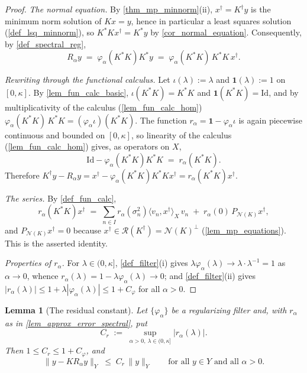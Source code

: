 \documentclass[a4paper]{report}
\theoremstyle{plain}
\newtheorem{lemma}[theorem]{Lemma}
\theoremstyle{definition}
\theoremstyle{remark}
\newcommand{\Ran}{\mathcal{R}}
\newcommand{\Ker}{\mathcal{N}}
\newcommand{\Id}{\mathrm{Id}}
\newcommand{\dg}{^{\dagger}}
\begin{document}
\begin{proof}
  \emph{The normal equation.}  By \cref{thm_mp_minnorm}(ii), $x\dg = K\dg y$ is the
  minimum norm solution of $Kx = y$, hence in particular a least squares solution
  (\cref{def_lsq_minnorm}), so $K^{*}Kx\dg = K^{*}y$ by \cref{cor_normal_equation}.
  Consequently, by \cref{def_spectral_reg},
  \[
    R_{\alpha}y \;=\; \varphi_{\alpha}(K^{*}K)K^{*}y
      \;=\; \varphi_{\alpha}(K^{*}K)\,K^{*}K\,x\dg .
  \]

  \emph{Rewriting through the functional calculus.}  Let $\iota(\lambda) := \lambda$ and
  $\mathbf{1}(\lambda) := 1$ on $[0,\kappa]$.  By \cref{lem_fun_calc_basic},
  $\iota(K^{*}K) = K^{*}K$ and $\mathbf{1}(K^{*}K) = \Id$, and by multiplicativity of the
  calculus (\cref{lem_fun_calc_hom}) $\varphi_{\alpha}(K^{*}K)\,K^{*}K =
  (\varphi_{\alpha}\iota)(K^{*}K)$.  The function $r_{\alpha} = \mathbf{1} -
  \varphi_{\alpha}\iota$ is again piecewise continuous and bounded on $[0,\kappa]$, so
  linearity of the calculus (\cref{lem_fun_calc_hom}) gives, as operators on $X$,
  \[
    \Id - \varphi_{\alpha}(K^{*}K)K^{*}K \;=\; r_{\alpha}(K^{*}K) .
  \]
  Therefore $K\dg y - R_{\alpha}y = x\dg - \varphi_{\alpha}(K^{*}K)K^{*}Kx\dg =
  r_{\alpha}(K^{*}K)x\dg$.

  \emph{The series.}  By \cref{def_fun_calc},
  \[
    r_{\alpha}(K^{*}K)x\dg \;=\; \sum_{n \in I} r_{\alpha}(\sigma_n^{2})
      \langle v_n, x\dg\rangle_X\, v_n \;+\; r_{\alpha}(0)\,P_{\Ker(K)}x\dg ,
  \]
  and $P_{\Ker(K)}x\dg = 0$ because $x\dg \in \Ran(K\dg) = \Ker(K)^{\perp}$
  (\cref{lem_mp_equations}).  This is the asserted identity.

  \emph{Properties of $r_{\alpha}$.}  For $\lambda \in (0,\kappa]$, \cref{def_filter}(i)
  gives $\lambda\varphi_{\alpha}(\lambda) \to \lambda\cdot\lambda^{-1} = 1$ as
  $\alpha \to 0$, whence $r_{\alpha}(\lambda) = 1 - \lambda\varphi_{\alpha}(\lambda) \to
  0$; and \cref{def_filter}(ii) gives $|r_{\alpha}(\lambda)| \le 1 +
  \lambda|\varphi_{\alpha}(\lambda)| \le 1 + C_{\varphi}$ for all $\alpha > 0$.
\end{proof}


\begin{lemma}[The residual constant]
  \label{lem_residual_constant}
  Let $\{\varphi_{\alpha}\}$ be a regularizing filter and, with $r_{\alpha}$ as in
  \cref{lem_approx_error_spectral}, put
  \[
    C_r \;:=\; \sup_{\alpha > 0,\ \lambda \in (0,\kappa]} |r_{\alpha}(\lambda)| .
  \]
  Then $1 \le C_r \le 1 + C_{\varphi}$, and
  \[
    \|y - KR_{\alpha}y\|_Y \;\le\; C_r\,\|y\|_Y
    \qquad \text{for all } y \in Y \text{ and all } \alpha > 0 .
  \]
\end{lemma}
\end{document}
